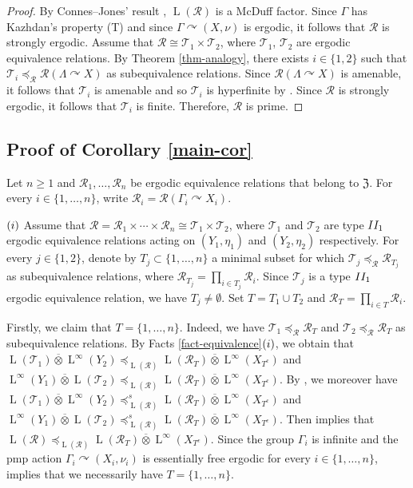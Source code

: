 \documentclass[11pt]{amsart}
\numberwithin{equation}{section}
\theoremstyle{plain}
\theoremstyle{definition}
\newcommand{\ovt}{\mathbin{\overline{\otimes}}}
\newcommand{\rL}{\operatorname{L}}
\begin{document}
\begin{proof}
By Connes--Jones'\! result \cite{CJ81}, $\rL(\mathscr R)$ is a McDuff factor. Since $\Gamma$ has Kazhdan's property (T) and since $\Gamma \curvearrowright (X, \nu)$ is ergodic, it follows that $\mathscr R$ is strongly ergodic. Assume that $\mathscr R \cong \mathscr T_1 \times \mathscr T_2$, where $\mathscr T_1$, $\mathscr T_2$ are ergodic equivalence relations. By Theorem \ref{thm-analogy}, there exists $i \in \{1, 2\}$ such that $\mathscr T_i \preceq_{\mathscr R} \mathscr R(\Lambda \curvearrowright X)$ as subequivalence relations. Since $\mathscr R(\Lambda \curvearrowright X)$ is amenable, it follows that $\mathscr T_i$ is amenable and so $\mathscr T_i$ is hyperfinite by \cite{CFW81}. Since $\mathscr R$ is strongly ergodic, it follows that $\mathscr T_i$ is finite. Therefore, $\mathscr R$ is prime.
\end{proof}


\subsection{Proof of Corollary \ref{main-cor}}

Let $n \geq 1$ and $\mathscr R_1, \dots, \mathscr R_n$ be ergodic equivalence relations that belong to $\mathfrak Z$. For every $i \in \{1, \dots, n\}$, write $\mathscr R_i = \mathscr R(\Gamma_i \curvearrowright X_i)$.

$(\rm i)$ Assume that $\mathscr R = \mathscr R_1 \times \cdots \times \mathscr R_n \cong \mathscr T_1 \times  \mathscr T_2$, where $ \mathscr T_1$ and $\mathscr T_2$ are type ${\rm II_1}$ ergodic equivalence relations acting on $(Y_1, \eta_1)$ and $(Y_2, \eta_2)$ respectively. For every $j \in \{1, 2\}$, denote by $T_j \subset \{1, \dots, n\}$ a minimal subset for which $\mathscr T_j \preceq_{\mathscr R} \mathscr R_{T_j}$ as subequivalence relations, where $\mathscr R_{T_j} = \prod_{i \in T_j} \mathscr R_i$. Since $\mathscr T_j$ is a type ${\rm II_1}$ ergodic equivalence relation, we have $T_j \neq \emptyset$. Set $T = T_1 \cup T_2$ and $\mathscr R_T = \prod_{i \in T} \mathscr R_i$. 

Firstly, we claim that $T = \{1, \dots, n\}$. Indeed, we have $\mathscr T_1 \preceq_{\mathscr R} \mathscr R_T$ and $\mathscr T_2 \preceq_{\mathscr R} \mathscr R_T$ as subequivalence relations. By Facts \ref{fact-equivalence}$(\rm i)$, we obtain that $\rL(\mathscr T_1) \ovt \rL^\infty(Y_2) \preceq_{\rL(\mathscr R)} \rL(\mathscr R_T) \ovt \rL^\infty(X_{T^c})$ and $\rL^\infty(Y_1) \ovt \rL(\mathscr T_2) \preceq_{\rL(\mathscr R)} \rL(\mathscr R_T) \ovt \rL^\infty(X_{T^c})$. By \cite[Lemma 2.4(3)]{DHI16}, we moreover have $\rL(\mathscr T_1) \ovt \rL^\infty(Y_2) \preceq^s_{\rL(\mathscr R)} \rL(\mathscr R_T) \ovt \rL^\infty(X_{T^c})$ and $\rL^\infty(Y_1) \ovt \rL(\mathscr T_2) \preceq^s_{\rL(\mathscr R)} \rL(\mathscr R_T) \ovt \rL^\infty(X_{T^c})$. Then \cite[Lemma 2.3]{BV12} implies that $\rL(\mathscr R) \preceq_{\rL(\mathscr R)} \rL(\mathscr R_T) \ovt \rL^\infty(X_{T^c})$. Since the group $\Gamma_i$ is infinite and the pmp action $\Gamma_i \curvearrowright (X_i, \nu_i)$ is essentially free ergodic for every $i \in \{1, \dots, n\}$, \cite[Theorem 4.4]{HI17} implies that we necessarily have $T = \{1, \dots, n\}$.
\end{document}
